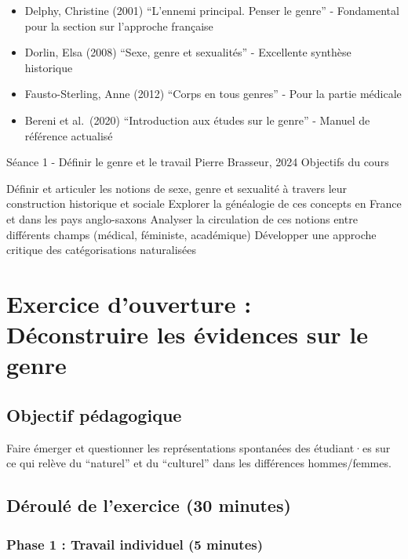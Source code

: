 \documentclass[
  letterpaper,
  DIV=11,
  numbers=noendperiod]{scrreprt}
\providecommand{\tightlist}{%
  \setlength{\itemsep}{0pt}\setlength{\parskip}{0pt}}\usepackage{longtable,booktabs,array}
\begin{document}
\begin{itemize}
\tightlist
\item
  Delphy, Christine (2001) ``L'ennemi principal. Penser le genre'' -
  Fondamental pour la section sur l'approche française
\item
  Dorlin, Elsa (2008) ``Sexe, genre et sexualités'' - Excellente
  synthèse historique
\item
  Fausto-Sterling, Anne (2012) ``Corps en tous genres'' - Pour la partie
  médicale
\item
  Bereni et al.~(2020) ``Introduction aux études sur le genre'' - Manuel
  de référence actualisé
\end{itemize}

Séance 1 - Définir le genre et le travail Pierre Brasseur, 2024
Objectifs du cours

Définir et articuler les notions de sexe, genre et sexualité à travers
leur construction historique et sociale Explorer la généalogie de ces
concepts en France et dans les pays anglo-saxons Analyser la circulation
de ces notions entre différents champs (médical, féministe, académique)
Développer une approche critique des catégorisations naturalisées


\chapter{Exercice d'ouverture : Déconstruire les évidences sur le
genre}\label{exercice-douverture-duxe9construire-les-uxe9vidences-sur-le-genre}

\section{Objectif pédagogique}\label{objectif-puxe9dagogique}

Faire émerger et questionner les représentations spontanées des
étudiant·es sur ce qui relève du ``naturel'' et du ``culturel'' dans les
différences hommes/femmes.

\section{Déroulé de l'exercice (30
minutes)}\label{duxe9rouluxe9-de-lexercice-30-minutes}

\subsection{Phase 1 : Travail individuel (5
minutes)}\label{phase-1-travail-individuel-5-minutes}
\end{document}
